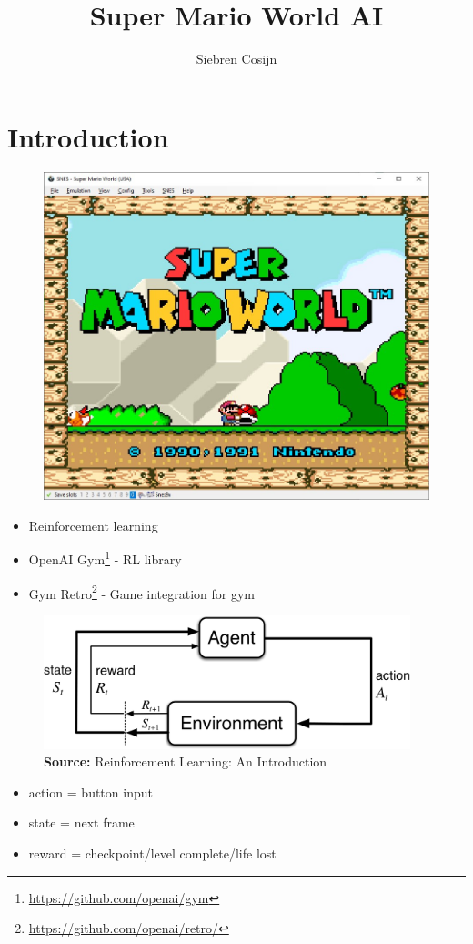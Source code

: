 \documentclass{article}
\title{Super Mario World AI}
\author{Siebren Cosijn}
\begin{document}
    \maketitle

    \section{Introduction}
    \begin{figure}[H]
        \centering
        \includegraphics[width=.85\textwidth]{start-screen}
    \end{figure}
    \begin{itemize}
        \item Reinforcement learning
        \item OpenAI Gym\footnote{\url{https://github.com/openai/gym}} - RL library
        \item Gym Retro\footnote{\url{https://github.com/openai/retro/}} - Game integration for gym
    \end{itemize}
    \begin{figure}[H]
        \centering
        \includegraphics[width=0.95\textwidth]{loop}
        \caption{\textbf{Source:} Reinforcement Learning: An Introduction}
        \label{fig:loop}
    \end{figure}
    \begin{itemize}
        \item action = button input
        \item state = next frame
        \item reward = checkpoint/level complete/life lost
    \end{itemize}
\end{document}
